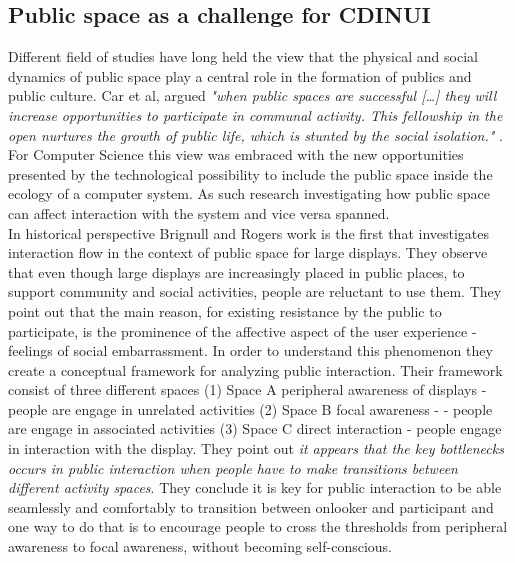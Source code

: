 \subsection{Public space as a challenge for CDINUI}
Different field of studies have long held the view that the physical and social dynamics of public space play a central role in the formation of publics and public culture. Car et al, argued \emph{"when public spaces are successful […] they will increase opportunities to participate in communal activity. This fellowship in the open nurtures the growth of public life, which is stunted by the social isolation."} \cite{carr:1992}. For Computer Science this view was embraced with the new opportunities presented by the technological possibility to include the public space inside the ecology of a computer system. As such research investigating how public space can affect interaction with the system and vice versa spanned.\\

In historical perspective Brignull and Rogers work\cite{Brignull:2003} is the first that investigates interaction flow in the context of public space for large displays. They observe that even though large displays are increasingly placed in public places, to support community and social activities, people are reluctant to use them. They point out that the main reason, for existing resistance by the public to participate, is the prominence of the affective aspect of the  user experience - feelings of social embarrassment. In order to understand this phenomenon they create a conceptual framework for analyzing public interaction. Their framework consist of three different spaces (1) Space A peripheral awareness of displays - people are engage in unrelated activities (2) Space B focal awareness - - people are engage in associated activities (3) Space C direct interaction - people engage in interaction with the display. They point out \emph{it appears that the key bottlenecks occurs in public interaction when people have to make transitions between different activity spaces}. They conclude  it is key for public interaction to be able seamlessly and comfortably to transition between onlooker and participant and one way to do that is to encourage people to cross the thresholds from peripheral awareness to focal awareness, without becoming self-conscious.\\

